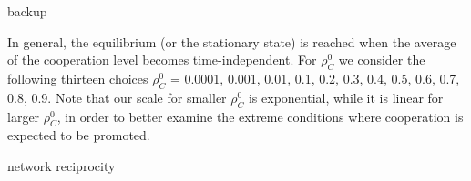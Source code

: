 backup

In general, the equilibrium (or the stationary state) is reached when the average
of the cooperation level becomes time-independent.
For $\rho_C^0$ we consider the following thirteen choices $\rho_C^0$ = 0.0001, 0.001, 0.01, 0.1, 0.2,
0.3, 0.4, 0.5, 0.6, 0.7, 0.8, 0.9.
Note that our scale for smaller $\rho_C^0$ is exponential, while it is linear for
larger $\rho_C^0$, in order to better examine the extreme conditions where
cooperation is expected to be promoted. 

network reciprocity \cite{nowak2006five}
